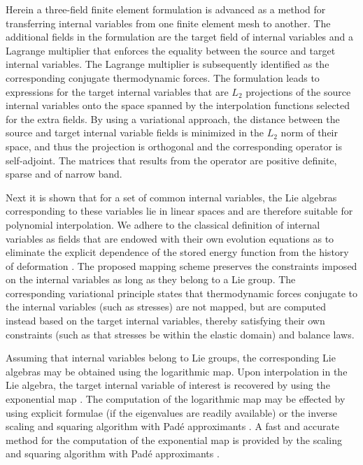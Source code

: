 \documentclass[12pt]{article}
\begin{document}
Herein a three-field finite element formulation is advanced as a
method for transferring internal variables from one finite element
mesh to another. The additional fields in the formulation are the
target field of internal variables and a Lagrange multiplier that
enforces the equality between the source and target internal
variables. The Lagrange multiplier is subsequently identified as the
corresponding conjugate thermodynamic forces. The formulation leads to
expressions for the target internal variables that are $L_2$
projections of the source internal variables onto the space spanned by
the interpolation functions selected for the extra fields. By using a
variational approach, the distance between the source and target
internal variable fields is minimized in the $L_2$ norm of their
space, and thus the projection is orthogonal and the corresponding
operator is self-adjoint. The matrices that results from the operator
are positive definite, sparse and of narrow band.

Next it is shown that for a set of common internal variables, the Lie
algebras corresponding to these variables lie in linear spaces and are
therefore suitable for polynomial interpolation.  We adhere to the
classical definition of internal variables as fields that are endowed
with their own evolution equations as to eliminate the explicit
dependence of the stored energy function from the history of
deformation \citep{Muschik:2001, Antman:2005}. The proposed mapping
scheme preserves the constraints imposed on the internal variables as
long as they belong to a Lie group. The corresponding variational
principle states that thermodynamic forces conjugate to the internal
variables (such as stresses) are not mapped, but are computed instead
based on the target internal variables, thereby satisfying their own
constraints (such as that stresses be within the elastic domain) and
balance laws.

Assuming that internal variables belong to Lie groups, the
corresponding Lie algebras may be obtained using the logarithmic
map. Upon interpolation in the Lie algebra, the target internal
variable of interest is recovered by using the exponential map
\citep{Marsden.Ratiu:1999, Sepanski:2007,
  Kosmann-Schwarzbach:2009}. The computation of the logarithmic map
may be effected by using explicit formulae (if the eigenvalues are
readily available) \citep{Jog:2008} or the inverse scaling and
squaring algorithm with Pad\'e approximants \citep{Cheng.etal:2001,
  Davies.Higham:2003}.  A fast and accurate method for the computation
of the exponential map is provided by the scaling and squaring
algorithm with Pad\'e approximants \citep{Higham:2001,Higham:2005}.
\end{document}
